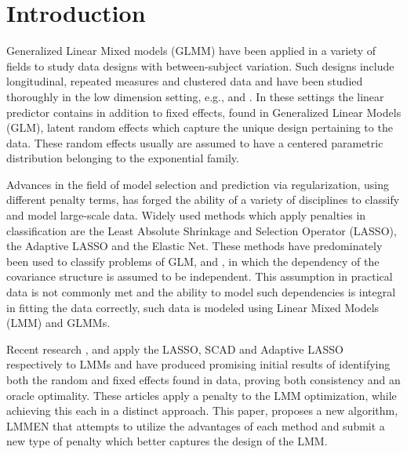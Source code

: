 \documentclass{article}
\begin{document}
	\section{Introduction}
		Generalized Linear Mixed models (GLMM) \cite{BreslowClayton1993} have been applied in a variety of fields to study data designs with between-subject variation. Such designs include longitudinal, repeated measures and clustered data and have been studied thoroughly in the low dimension setting, e.g., \cite{Bates2010} and \cite{searle1992variance}. In these settings the linear predictor contains in addition to fixed effects, found in Generalized Linear Models (GLM), latent random effects which capture the unique design pertaining to the data. These random effects usually are assumed to have a centered parametric distribution belonging to the exponential family.
		
  Advances in the field of model selection and prediction via regularization, using different penalty terms, has forged the ability of a variety of disciplines to classify and model large-scale data. Widely used methods which apply penalties in classification are the Least Absolute Shrinkage and Selection Operator (LASSO), the Adaptive LASSO and the Elastic Net. These methods have predominately been used to classify problems of GLM, \cite{FHT2010} and \cite{VandeGeer2008}, in which the dependency of the covariance structure is assumed to be independent. This assumption in practical data is not commonly met and the ability to model such dependencies is integral in fitting the data correctly, such data is modeled using Linear Mixed Models (LMM) and GLMMs.

  Recent research \cite{SchelldorferBuhlmann2011},\cite{fan2012variable} and \cite{BKG2010} apply the LASSO, SCAD and Adaptive LASSO respectively to LMMs and have produced promising initial results of identifying both the random and fixed effects found in data, proving both consistency and an oracle optimality. These articles apply a penalty to the LMM optimization, while achieving this each in a distinct approach. This paper, proposes a new algorithm, LMMEN that attempts to utilize the advantages of each method and submit a new type of penalty which better captures the design of the LMM. %
		
\end{document}
